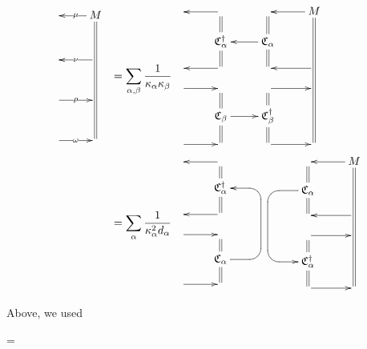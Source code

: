 \begin{align}
\bcen
\xymatrix@R=1pc{
&M\ar@2{-}[dddddd]
\ar[l]|\mu
\\&
\\
&\ar[l]|\nu
\\&
\\
\ar[r]|\rho&
\\&
\\
\ar[r]|\omega&
}
\ecen
&=
\sum_{\alp, \beta}
\frac{1}{\kappa_\alp \kappa_\beta}
\bcen
\xymatrix@R=1pc{
&\ar[l]&&M
\ar@2{-}[ddddd]
\ar[l]
\\
&\ger{C}_\alp^\dagger\ar@2{-}[u]
\ar@2{-}[d]&\ger{C}_\alp\ar@2{-}[u]
\ar@2{-}[d]
\ar[l]
&
\\
&\ar[l]&&\ar[l]
\\
\ar[r]&&\ar[r]&
\\
&\ger{C}_\beta
\ar@2{-}[u]
\ar@2{-}[d]
\ar[r]
&\ger{C}_\beta^\dagger\ar@2{-}[u]
\ar@2{-}[d]
&
\\
\ar[r]&&\ar[r]&
}
\ecen
\\
&=
\sum_{\alp}
\frac{1}{\kappa^2_\alp d_\alp}
\bcen
\xymatrix@R=1pc{
&\ar[l]&
\\
&\ger{C}_\alp^\dagger\ar@2{-}[u]
\ar@2{-}[d]
&
\\
&\ar[l]&
\\
\ar[r]&&
\\
&\ger{C}_\alp
\ar@2{-}[u]
\ar@2{-}[d]
\ar`r[ruuu]
`[uuu][uuu]
&
\\
\ar[r]&&
}
\xymatrix@R=1pc{
&&M
\ar@2{-}[ddddd]
\ar[l]
\\
&\ger{C}_\alp\ar@2{-}[u]
\ar@2{-}[d]
\ar`l[ld]
`[ddd][ddd]
&
\\
&&\ar[l]
\\
&\ar[r]&
\\
&\ger{C}_\alp^\dagger\ar@2{-}[u]
\ar@2{-}[d]
&
\\
&\ar[r]&
}
\ecen
\end{align}

Above, we used

\beq
\bcen
{}
\ecen
=
\bcen
{}\ecen
\bcen
{}
\ecen
\eeq




